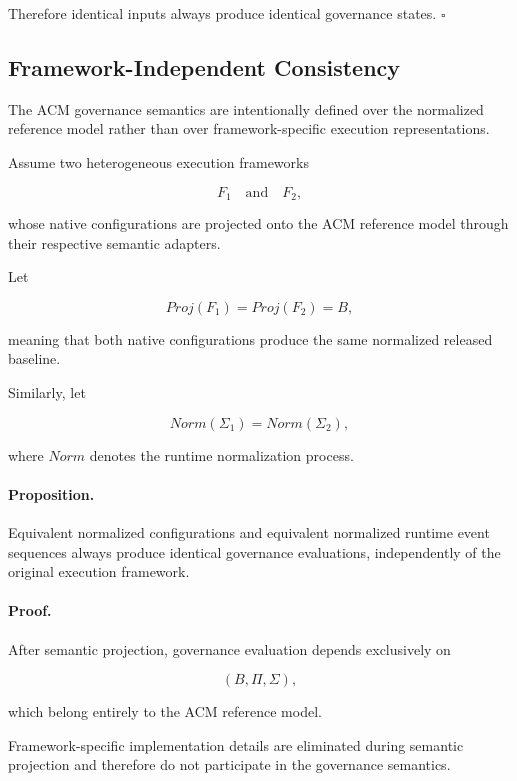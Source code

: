 \documentclass[10pt]{article}
\begin{document}
	Therefore identical inputs always produce identical governance states.
	\hfill$\square$
	
	\subsection{Framework-Independent Consistency}
	\label{appendix:framework_independent_consistency}
	
	The ACM governance semantics are intentionally defined over the normalized
	reference model rather than over framework-specific execution representations.
	
	Assume two heterogeneous execution frameworks
	
	\[
	F_1
	\quad\text{and}\quad
	F_2,
	\]
	
	whose native configurations are projected onto the ACM reference model through
	their respective semantic adapters.
	
	Let
	
	\[
	Proj(F_1)
	=
	Proj(F_2)
	=
	B,
	\]
	
	meaning that both native configurations produce the same normalized released
	baseline.
	
	Similarly, let
	
	\[
	Norm(\Sigma_1)
	=
	Norm(\Sigma_2),
	\]
	
	where
	$Norm$
	denotes the runtime normalization process.
	
	\paragraph*{Proposition.}
	
	Equivalent normalized configurations and equivalent normalized runtime event
	sequences always produce identical governance evaluations, independently of the
	original execution framework.
	
	\paragraph*{Proof.}
	
	After semantic projection, governance evaluation depends exclusively on
	
	\[
	(B,\Pi,\Sigma),
	\]
	
	which belong entirely to the ACM reference model.
	
	Framework-specific implementation details are eliminated during semantic
	projection and therefore do not participate in the governance semantics.
	
\end{document}
